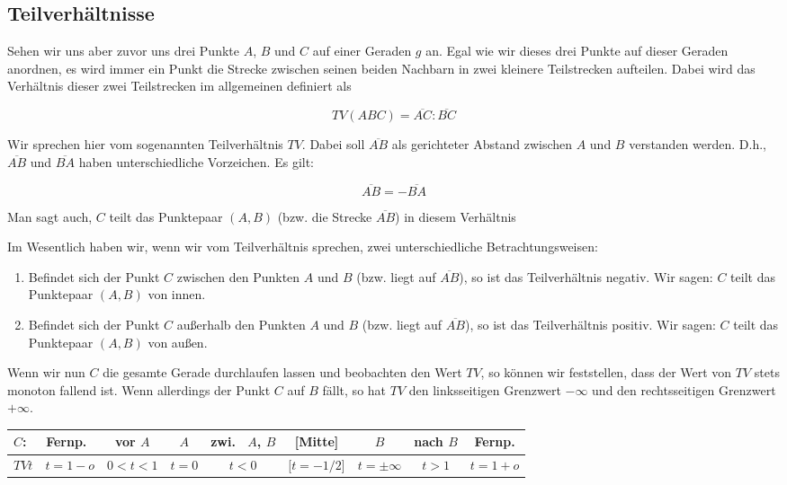 \documentclass[12pt,a4paper]{article}
\begin{document}
\subsection{Teilverhältnisse}
\label{subsec:teilverh}
Sehen wir uns aber zuvor uns drei Punkte $A$, $B$ und $C$ auf einer Geraden $g$ an. Egal wie wir dieses drei Punkte auf dieser Geraden anordnen, es wird immer ein Punkt die Strecke zwischen seinen beiden Nachbarn in zwei kleinere Teilstrecken aufteilen. Dabei wird das Verhältnis dieser zwei Teilstrecken im allgemeinen definiert als

\[TV(A B C) = \overline{A C} : \overline{B C}\]

Wir sprechen hier vom sogenannten Teilverhältnis $TV$. Dabei soll $\overline{A B}$ als gerichteter Abstand zwischen $A$ und $B$ verstanden werden. D.h., $\overline{A B}$ und $\overline{B A}$ haben unterschiedliche Vorzeichen. Es gilt: 

\[\overline{A B} = -\overline{B A}\]

Man sagt auch, $C$ teilt das Punktepaar $(A , B)$ (bzw. die Strecke $\overline{A B}$) in diesem Verhältnis \citep[S.~76]{projektiveGeometrie}

Im Wesentlich haben wir, wenn wir vom Teilverhältnis sprechen, zwei unterschiedliche Betrachtungsweisen:
\begin{enumerate}
\item Befindet sich der Punkt $C$ zwischen den Punkten $A$ und $B$ (bzw. liegt auf $\overline{A B}$), so ist das Teilverhältnis negativ. Wir sagen: $C$ teilt das Punktepaar $(A , B)$ \glqq von innen\grqq .
\item Befindet sich der Punkt $C$ außerhalb den Punkten $A$ und $B$ (bzw. liegt auf $\overline{A B}$), so ist das Teilverhältnis positiv. Wir sagen: $C$ teilt das Punktepaar $(A , B)$ \glqq von außen\grqq .
\end{enumerate}

Wenn wir nun $C$ die gesamte Gerade durchlaufen lassen und beobachten den Wert $TV$, so können wir feststellen, dass der Wert von $TV$ stets monoton fallend ist. Wenn allerdings der Punkt $C$ auf $B$ fällt, so hat $TV$ den linksseitigen Grenzwert $-\infty$ und den rechtsseitigen Grenzwert $+\infty$.
\newpage
\begin{center}
\begin{scriptsize}
\begin{tabular}[htbp]{l|c|c|c|c|c|c|c|c}
$C$: & Fernp.~ & vor $A$ &  $A$ & zwi.~ $A$, $B$ & [Mitte] & $B$ & nach $B$ & Fernp.\\
\hline
$TV t$ & $t = 1 - o$ & $0 < t < 1$ & $t = 0$ & $t < 0$ & [$t = -1/2$] & $t = \pm\infty$ & $t > 1$ & $t = 1 + o$\\
\end{tabular}
\end{scriptsize}
\end{center}
\end{document}
